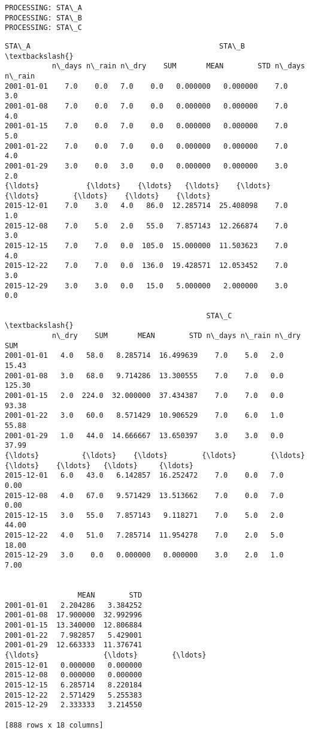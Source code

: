 \documentclass[11pt]{article}
\makeatletter
\newcommand{\boxspacing}{\kern\kvtcb@left@rule\kern\kvtcb@boxsep}
\newcommand{\prompt}[4]{
        {\ttfamily\llap{{\color{#2}[#3]:\hspace{3pt}#4}}\vspace{-\baselineskip}}
    }
\makeatother
\begin{document}
    \begin{Verbatim}[commandchars=\\\{\}]
PROCESSING: STA\_A
PROCESSING: STA\_B
PROCESSING: STA\_C
    \end{Verbatim}

            \begin{tcolorbox}[breakable, size=fbox, boxrule=.5pt, pad at break*=1mm, opacityfill=0]
\prompt{Out}{outcolor}{ }{\boxspacing}
\begin{Verbatim}[commandchars=\\\{\}]
            STA\_A                                            STA\_B         \textbackslash{}
           n\_days n\_rain n\_dry    SUM       MEAN        STD n\_days n\_rain
2001-01-01    7.0    0.0   7.0    0.0   0.000000   0.000000    7.0    3.0
2001-01-08    7.0    0.0   7.0    0.0   0.000000   0.000000    7.0    4.0
2001-01-15    7.0    0.0   7.0    0.0   0.000000   0.000000    7.0    5.0
2001-01-22    7.0    0.0   7.0    0.0   0.000000   0.000000    7.0    4.0
2001-01-29    3.0    0.0   3.0    0.0   0.000000   0.000000    3.0    2.0
{\ldots}           {\ldots}    {\ldots}   {\ldots}    {\ldots}        {\ldots}        {\ldots}    {\ldots}    {\ldots}
2015-12-01    7.0    3.0   4.0   86.0  12.285714  25.408098    7.0    1.0
2015-12-08    7.0    5.0   2.0   55.0   7.857143  12.266874    7.0    3.0
2015-12-15    7.0    7.0   0.0  105.0  15.000000  11.503623    7.0    4.0
2015-12-22    7.0    7.0   0.0  136.0  19.428571  12.053452    7.0    3.0
2015-12-29    3.0    3.0   0.0   15.0   5.000000   2.000000    3.0    0.0

                                               STA\_C                       \textbackslash{}
           n\_dry    SUM       MEAN        STD n\_days n\_rain n\_dry     SUM
2001-01-01   4.0   58.0   8.285714  16.499639    7.0    5.0   2.0   15.43
2001-01-08   3.0   68.0   9.714286  13.300555    7.0    7.0   0.0  125.30
2001-01-15   2.0  224.0  32.000000  37.434387    7.0    7.0   0.0   93.38
2001-01-22   3.0   60.0   8.571429  10.906529    7.0    6.0   1.0   55.88
2001-01-29   1.0   44.0  14.666667  13.650397    3.0    3.0   0.0   37.99
{\ldots}          {\ldots}    {\ldots}        {\ldots}        {\ldots}    {\ldots}    {\ldots}   {\ldots}     {\ldots}
2015-12-01   6.0   43.0   6.142857  16.252472    7.0    0.0   7.0    0.00
2015-12-08   4.0   67.0   9.571429  13.513662    7.0    0.0   7.0    0.00
2015-12-15   3.0   55.0   7.857143   9.118271    7.0    5.0   2.0   44.00
2015-12-22   4.0   51.0   7.285714  11.954278    7.0    2.0   5.0   18.00
2015-12-29   3.0    0.0   0.000000   0.000000    3.0    2.0   1.0    7.00


                 MEAN        STD
2001-01-01   2.204286   3.384252
2001-01-08  17.900000  32.992996
2001-01-15  13.340000  12.806884
2001-01-22   7.982857   5.429001
2001-01-29  12.663333  11.376741
{\ldots}               {\ldots}        {\ldots}
2015-12-01   0.000000   0.000000
2015-12-08   0.000000   0.000000
2015-12-15   6.285714   8.220184
2015-12-22   2.571429   5.255383
2015-12-29   2.333333   3.214550

[888 rows x 18 columns]
\end{Verbatim}
\end{tcolorbox}
        
\end{document}
